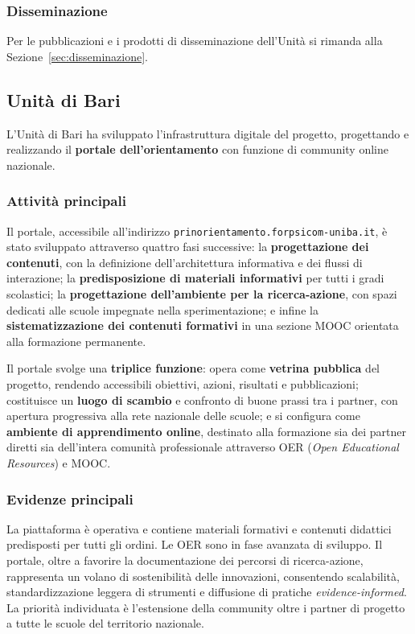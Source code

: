 \documentclass[12pt,a4paper]{article}
\begin{document}
\subsubsection{Disseminazione}

Per le pubblicazioni e i prodotti di disseminazione dell'Unit\`a si rimanda alla Sezione~\ref{sec:disseminazione}.


\subsection{Unit\`a di Bari}
\label{sec:bari}

L'Unit\`a di Bari ha sviluppato l'infrastruttura digitale del progetto, progettando e realizzando il \textbf{portale dell'orientamento} con funzione di community online nazionale.

\subsubsection{Attivit\`a principali}

Il portale, accessibile all'indirizzo \texttt{prinorientamento.forpsicom-uniba.it}, \`e stato sviluppato attraverso quattro fasi successive: la \textbf{progettazione dei contenuti}, con la definizione dell'architettura informativa e dei flussi di interazione; la \textbf{predisposizione di materiali informativi} per tutti i gradi scolastici; la \textbf{progettazione dell'ambiente per la ricerca-azione}, con spazi dedicati alle scuole impegnate nella sperimentazione; e infine la \textbf{sistematizzazione dei contenuti formativi} in una sezione MOOC orientata alla formazione permanente.

Il portale svolge una \textbf{triplice funzione}: opera come \textbf{vetrina pubblica} del progetto, rendendo accessibili obiettivi, azioni, risultati e pubblicazioni; costituisce un \textbf{luogo di scambio} e confronto di buone prassi tra i partner, con apertura progressiva alla rete nazionale delle scuole; e si configura come \textbf{ambiente di apprendimento online}, destinato alla formazione sia dei partner diretti sia dell'intera comunit\`a professionale attraverso OER (\textit{Open Educational Resources}) e MOOC.

\subsubsection{Evidenze principali}

La piattaforma \`e operativa e contiene materiali formativi e contenuti didattici predisposti per tutti gli ordini. Le OER sono in fase avanzata di sviluppo. Il portale, oltre a favorire la documentazione dei percorsi di ricerca-azione, rappresenta un volano di sostenibilit\`a delle innovazioni, consentendo scalabilit\`a, standardizzazione leggera di strumenti e diffusione di pratiche \textit{evidence-informed}. La priorit\`a individuata \`e l'estensione della community oltre i partner di progetto a tutte le scuole del territorio nazionale.
\end{document}
